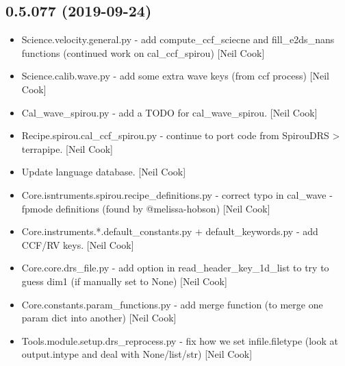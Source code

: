 \documentclass[a4paper,10pt,english]{report}
\begin{document}
\subsection{0.5.077 (2019-09-24)}
\label{\detokenize{misc/changelog:id64}}\begin{itemize}
\item {} 
Science.velocity.general.py - add compute\_ccf\_sciecne and
fill\_e2ds\_nans functions (continued work on cal\_ccf\_spirou) {[}Neil
Cook{]}

\item {} 
Science.calib.wave.py - add some extra wave keys (from ccf process)
{[}Neil Cook{]}

\item {} 
Cal\_wave\_spirou.py - add a TODO for cal\_wave\_spirou. {[}Neil Cook{]}

\item {} 
Recipe.spirou.cal\_ccf\_spirou.py - continue to port code from SpirouDRS
\textendash{}\textgreater{} terrapipe. {[}Neil Cook{]}

\item {} 
Update language database. {[}Neil Cook{]}

\item {} 
Core.isntruments.spirou.recipe\_definitions.py - correct typo in
cal\_wave -fpmode definitions (found by @melissa-hobson) {[}Neil Cook{]}

\item {} 
Core.instruments.*.default\_constants.py + default\_keywords.py - add
CCF/RV keys. {[}Neil Cook{]}

\item {} 
Core.core.drs\_file.py - add option in read\_header\_key\_1d\_list to try
to guess dim1 (if manually set to None) {[}Neil Cook{]}

\item {} 
Core.constants.param\_functions.py - add merge function (to merge one
param dict into another) {[}Neil Cook{]}

\item {} 
Tools.module.setup.drs\_reprocess.py - fix how we set infile.filetype
(look at output.intype and deal with None/list/str) {[}Neil Cook{]}

\end{itemize}
\end{document}
